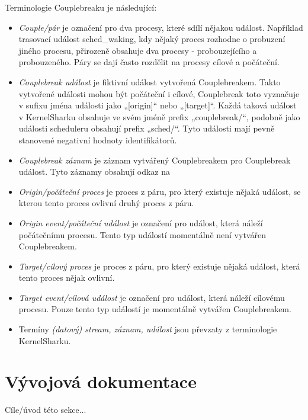 Terminologie Couplebreaku je následující:
\begin{itemize}
    \item \emph{Couple/pár} je označení pro dva procesy, které sdílí nějakou událost. Například trasovací událost sched\_waking, kdy nějaký proces rozhodne o probuzení jiného procesu, přirozeně obsahuje dva procesy - probouzejícího a probouzeného. Páry se dají často rozdělit na procesy cílové a počáteční.
    \item \emph{Couplebreak událost} je fiktivní událost vytvořená Couplebreakem. Takto vytvořené události mohou být počáteční i cílové, Couplebreak toto vyznačuje v sufixu jména události jako „[origin]“ nebo „[target]“. Každá taková událost v KernelSharku obsahuje ve svém jméně prefix „couplebreak/“, podobně jako události scheduleru obsahují prefix „sched/“. Tyto události mají pevně stanovené negativní hodnoty identifikátorů.
    \item \emph{Couplebreak záznam} je záznam vytvářený Couplebreakem pro Couplebreak událost. Tyto záznamy obsahují odkaz na 
    \item \emph{Origin/počáteční proces} je proces z páru, pro který existuje nějaká událost, se kterou tento proces ovlivní druhý proces z páru.
    \item \emph{Origin event/počáteční událost} je označení pro událost, která náleží počátečnímu procesu. Tento typ událostí momentálně není vytvářen Couplebreakem.
    \item \emph{Target/cílový proces} je proces z páru, pro který existuje nějaká událost, která tento proces nějak ovlivní. 
    \item \emph{Target event/cílová událost} je označení pro událost, která náleží cílovému procesu. Pouze tento typ událostí je momentálně vytvářen Couplebreakem.
    \item Termíny \emph{(datový) stream, záznam, událost} jsou převzaty z terminologie KernelSharku.
\end{itemize}

\section{Vývojová dokumentace}
Cíle/úvod této sekce...

